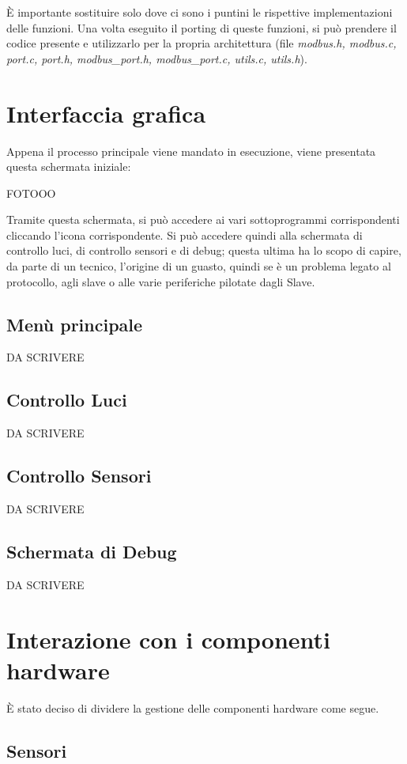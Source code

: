 \documentclass[a4paper,titlepage]{book}
\begin{document}
È importante sostituire solo dove ci sono i puntini le rispettive implementazioni delle funzioni. Una volta eseguito il porting di queste funzioni, si può prendere il codice presente e utilizzarlo per la propria architettura (file \textit{modbus.h, modbus.c, port.c, port.h, modbus\_port.h, modbus\_port.c, utils.c, utils.h}).


\section{Interfaccia grafica}

Appena il processo principale viene mandato in esecuzione, viene presentata questa schermata iniziale:

FOTOOO

Tramite questa schermata, si può accedere ai vari sottoprogrammi corrispondenti cliccando l'icona corrispondente. Si può accedere quindi alla schermata di controllo luci, di controllo sensori e di debug; questa ultima ha lo scopo di capire, da parte di un tecnico, l'origine di un guasto, quindi se è un problema legato al protocollo, agli slave o alle varie periferiche pilotate dagli Slave. 

\subsection{Menù principale}
DA SCRIVERE
\subsection{Controllo Luci}
DA SCRIVERE
\subsection{Controllo Sensori}
DA SCRIVERE
\subsection{Schermata di Debug}
DA SCRIVERE

\section{Interazione con i componenti hardware}

È stato deciso di dividere la gestione delle componenti hardware come segue.

\subsection{Sensori}
\end{document}
